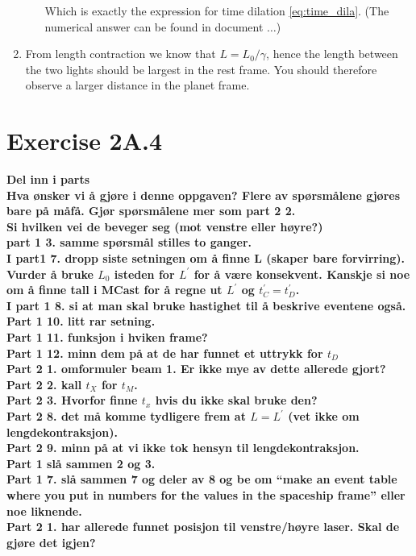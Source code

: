 \documentclass[a4paper,10pt,english]{article}
\begin{document}
\begin{enumerate}
\begin{enumerate}
Which is exactly the expression for time dilation \ref{eq:time_dila}. (The numerical answer can be found in document $\ldots$)

\end{enumerate}

\item From length contraction we know that $L=L_0/\gamma$, hence the length between the two lights should be largest in the rest frame. You should therefore observe a larger distance in the planet frame.   

\end{enumerate}








\section*{Exercise 2A.4}
\textbf{Del inn i parts\\Hva ønsker vi å gjøre i denne oppgaven? Flere av spørsmålene gjøres bare på måfå. Gjør spørsmålene mer som part 2 2.\\Si hvilken vei de beveger seg (mot venstre eller høyre?)\\part 1 3. samme spørsmål stilles to ganger.\\I part1 7. dropp siste setningen om å finne L (skaper bare forvirring). Vurder å bruke $L_{0}$ isteden for $L^{\prime}$ for å være konsekvent. Kanskje si noe om å finne tall i MCast for å regne ut $L^{\prime}$ og $t_{C}^{\prime}=t_{D}^{\prime}$.\\ I part 1 8. si at man skal bruke hastighet til å beskrive eventene også.\\ Part 1 10. litt rar setning.\\Part 1 11. funksjon i hviken frame?\\Part 1 12. minn dem på at de har funnet et uttrykk for $t_{D}$\\Part 2 1. omformuler beam 1. Er ikke mye av dette allerede gjort?\\Part 2 2. kall $t_{X}$ for $t_{M}$.\\Part 2 3. Hvorfor finne $t_{x}$ hvis du ikke skal bruke den?\\Part 2 8. det må komme tydligere frem at $L=L^{\prime}$ (vet ikke om lengdekontraksjon).\\Part 2 9. minn på at vi ikke tok hensyn til lengdekontraksjon.\\Part 1 slå sammen 2 og 3.\\Part 1 7. slå sammen 7 og deler av 8 og be om ``make an event table where you put in numbers for the values in the spaceship frame'' eller noe liknende.\\Part 2 1. har allerede funnet posisjon til venstre/høyre laser. Skal de gjøre det igjen?}
\end{document}
